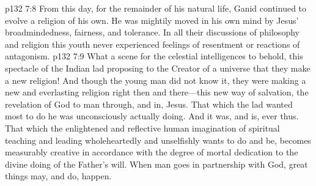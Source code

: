 \vs p132 7:8 From this day, for the remainder of his natural life, Ganid continued to evolve a religion of his own. He was mightily moved in his own mind by Jesus’ broadmindedness, fairness, and tolerance. In all their discussions of philosophy and religion this youth never experienced feelings of resentment or reactions of antagonism.
\pc \vs p132 7:9 What a scene for the celestial intelligences to behold, this spectacle of the Indian lad proposing to the Creator of a universe that they make a new religion! And though the young man did not know it, they were making a new and everlasting religion right then and there---this new way of salvation, the revelation of God to man through, and in, Jesus. That which the lad wanted most to do he was unconsciously actually doing. And it was, and is, ever thus. That which the enlightened and reflective human imagination of spiritual teaching and leading wholeheartedly and unselfishly wants to do and be, becomes measurably creative in accordance with the degree of mortal dedication to the divine doing of the Father’s will. When man goes in partnership with God, great things may, and do, happen.
